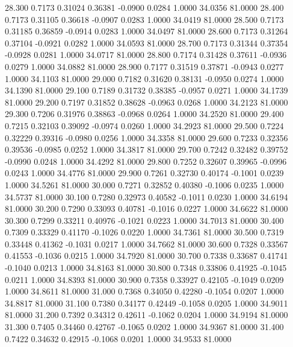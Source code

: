  28.300   0.7173   0.31024   0.36381  -0.0900   0.0284   1.0000  34.0356  81.0000
  28.400   0.7173   0.31105   0.36618  -0.0907   0.0283   1.0000  34.0419  81.0000
  28.500   0.7173   0.31185   0.36859  -0.0914   0.0283   1.0000  34.0497  81.0000
  28.600   0.7173   0.31264   0.37104  -0.0921   0.0282   1.0000  34.0593  81.0000
  28.700   0.7173   0.31344   0.37354  -0.0928   0.0281   1.0000  34.0717  81.0000
  28.800   0.7174   0.31428   0.37611  -0.0936   0.0279   1.0000  34.0882  81.0000
  28.900   0.7177   0.31519   0.37871  -0.0943   0.0277   1.0000  34.1103  81.0000
  29.000   0.7182   0.31620   0.38131  -0.0950   0.0274   1.0000  34.1390  81.0000
  29.100   0.7189   0.31732   0.38385  -0.0957   0.0271   1.0000  34.1739  81.0000
  29.200   0.7197   0.31852   0.38628  -0.0963   0.0268   1.0000  34.2123  81.0000
  29.300   0.7206   0.31976   0.38863  -0.0968   0.0264   1.0000  34.2520  81.0000
  29.400   0.7215   0.32103   0.39092  -0.0974   0.0260   1.0000  34.2923  81.0000
  29.500   0.7224   0.32229   0.39316  -0.0980   0.0256   1.0000  34.3358  81.0000
  29.600   0.7233   0.32356   0.39536  -0.0985   0.0252   1.0000  34.3817  81.0000
  29.700   0.7242   0.32482   0.39752  -0.0990   0.0248   1.0000  34.4292  81.0000
  29.800   0.7252   0.32607   0.39965  -0.0996   0.0243   1.0000  34.4776  81.0000
  29.900   0.7261   0.32730   0.40174  -0.1001   0.0239   1.0000  34.5261  81.0000
  30.000   0.7271   0.32852   0.40380  -0.1006   0.0235   1.0000  34.5737  81.0000
  30.100   0.7280   0.32973   0.40582  -0.1011   0.0230   1.0000  34.6194  81.0000
  30.200   0.7290   0.33093   0.40781  -0.1016   0.0227   1.0000  34.6622  81.0000
  30.300   0.7299   0.33211   0.40976  -0.1021   0.0223   1.0000  34.7013  81.0000
  30.400   0.7309   0.33329   0.41170  -0.1026   0.0220   1.0000  34.7361  81.0000
  30.500   0.7319   0.33448   0.41362  -0.1031   0.0217   1.0000  34.7662  81.0000
  30.600   0.7328   0.33567   0.41553  -0.1036   0.0215   1.0000  34.7920  81.0000
  30.700   0.7338   0.33687   0.41741  -0.1040   0.0213   1.0000  34.8163  81.0000
  30.800   0.7348   0.33806   0.41925  -0.1045   0.0211   1.0000  34.8393  81.0000
  30.900   0.7358   0.33927   0.42105  -0.1049   0.0209   1.0000  34.8611  81.0000
  31.000   0.7368   0.34050   0.42280  -0.1054   0.0207   1.0000  34.8817  81.0000
  31.100   0.7380   0.34177   0.42449  -0.1058   0.0205   1.0000  34.9011  81.0000
  31.200   0.7392   0.34312   0.42611  -0.1062   0.0204   1.0000  34.9194  81.0000
  31.300   0.7405   0.34460   0.42767  -0.1065   0.0202   1.0000  34.9367  81.0000
  31.400   0.7422   0.34632   0.42915  -0.1068   0.0201   1.0000  34.9533  81.0000
